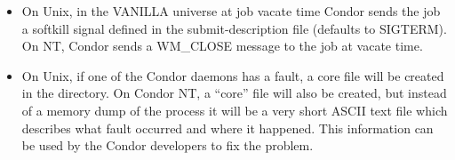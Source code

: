 \begin{itemize}
\item On Unix, in the VANILLA universe at job vacate time Condor sends the
job a softkill signal defined in the submit-description file (defaults to
SIGTERM).  On NT, Condor sends a WM\_CLOSE message to the job at vacate
time.

\item On Unix, if one of the Condor daemons has a fault, a core file
will be created in the  directory.  On Condor NT, a
``core'' file will also be created, but instead of a memory dump of the
process it will be a very short ASCII text file which describes what
fault occurred and where it happened.  This information can be used by
the Condor developers to fix the problem.

\end{itemize}
